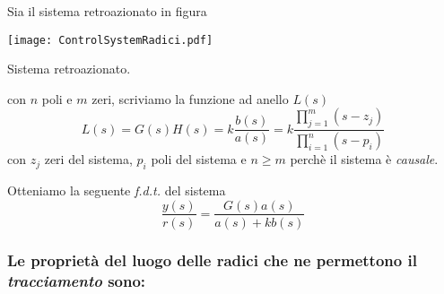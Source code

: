 Sia il sistema retroazionato in figura
\begin{center}
	\texttt{[image: ControlSystemRadici.pdf]}
	\caption{Sistema retroazionato.}
\end{center}
con $n$ poli e $m$ zeri, scriviamo la funzione ad anello $L(s)$
\begin{equation}
	L(s) = G(s)H(s) = k \frac{b(s)}{a(s)} = k \frac{ \prod_{j=1}^{m} (s - z_j)}{ \prod_{i = 1}^{n} (s - p_i)}
\end{equation}
con $z_j$ zeri del sistema, $p_i$ poli del sistema e $n \geqslant m$ perchè il sistema è \emph{causale}.

Otteniamo la seguente \emph{f.d.t.} del sistema
\begin{equation}
	\frac{y(s)}{r(s)} = \frac{G(s) a(s)}{a(s) + k b(s)}
\end{equation}

\subsubsection{Le proprietà del luogo delle radici che ne permettono il \emph{tracciamento} sono:}

